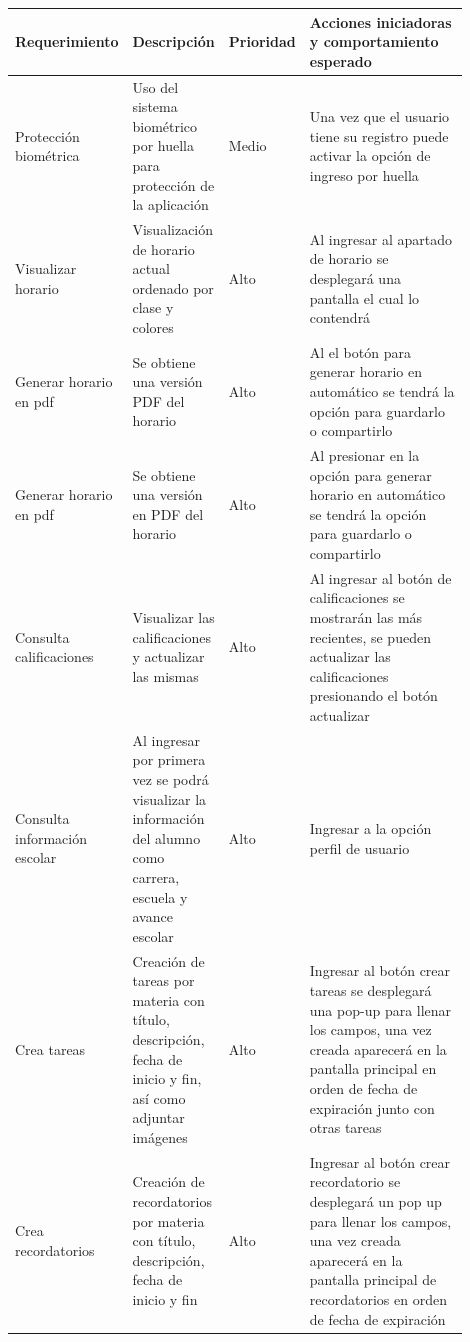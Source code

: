 \documentclass[10pt]{article}
\begin{document}
\begin{longtable}{|p{0.2\linewidth}|p{0.2\linewidth}|p{0.1\linewidth}|p{0.4\linewidth}|}
\hline
\textbf{Requerimiento} & \textbf{Descripción} & \textbf{Prioridad} & \textbf{Acciones iniciadoras y comportamiento esperado} \\ \hline

Protección biométrica  & Uso del sistema biométrico por huella para protección de la aplicación & Medio     & Una vez que el usuario tiene su registro puede activar la opción de ingreso por huella  \\\hline

Visualizar horario     & Visualización de horario actual ordenado por clase y colores           & Alto      & Al ingresar al apartado de horario se desplegará una pantalla el cual lo contendrá  \\\hline

Generar horario en pdf & Se obtiene una versión PDF del horario                                 & Alto      & Al  el botón para generar horario en automático se tendrá la opción para guardarlo o compartirlo \\\hline

{Generar horario en pdf} & {Se obtiene una versión en PDF del horario} & {Alto} & {Al presionar en la opción para generar horario en automático se tendrá la opción para guardarlo o compartirlo} \\ \hline

{Consulta calificaciones} & {Visualizar las calificaciones y actualizar las mismas} & {Alto} & {Al ingresar al botón de calificaciones se mostrarán las más recientes, se pueden actualizar las calificaciones presionando el botón actualizar} \\ \hline

{Consulta información escolar} & {Al ingresar por primera vez se podrá visualizar la información del alumno como carrera, escuela y avance escolar} & {Alto} & {Ingresar a la opción perfil de usuario} \\ \hline

{Crea tareas} & {Creación de tareas por materia con título, descripción, fecha de inicio y fin, así como adjuntar imágenes} & {Alto} & {Ingresar al botón crear tareas se desplegará una pop-up para llenar los campos, una vez creada aparecerá en la pantalla principal en orden de fecha de expiración junto con otras tareas} \\ \hline

{Crea recordatorios} & {Creación de recordatorios por materia con título, descripción, fecha de inicio y fin} & {Alto} & {Ingresar al botón crear recordatorio se desplegará un pop up para llenar los campos, una vez creada aparecerá en la pantalla principal de recordatorios en orden de fecha de expiración} \\ \hline


\end{longtable}
\end{document}

